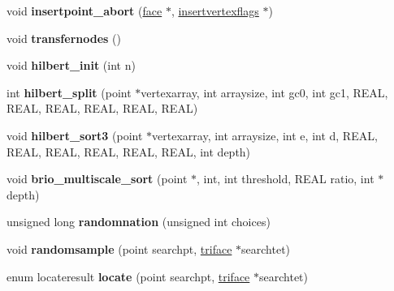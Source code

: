 \begin{DoxyCompactItemize}
\item 
\hypertarget{classtetgenmesh_ac7173aaaeb5600daa685af9c2c718834}{void {\bfseries insertpoint\-\_\-abort} (\hyperlink{classtetgenmesh_1_1face}{face} $\ast$, \hyperlink{classtetgenmesh_1_1insertvertexflags}{insertvertexflags} $\ast$)}\label{classtetgenmesh_ac7173aaaeb5600daa685af9c2c718834}

\item 
\hypertarget{classtetgenmesh_aca4cdd18ce8662d83d00f3be302e594d}{void {\bfseries transfernodes} ()}\label{classtetgenmesh_aca4cdd18ce8662d83d00f3be302e594d}

\item 
\hypertarget{classtetgenmesh_a5b84bd9ae3b1797a1e11730b23c1a2c0}{void {\bfseries hilbert\-\_\-init} (int n)}\label{classtetgenmesh_a5b84bd9ae3b1797a1e11730b23c1a2c0}

\item 
\hypertarget{classtetgenmesh_a11227c742897ec6e617a82dc61fc460d}{int {\bfseries hilbert\-\_\-split} (point $\ast$vertexarray, int arraysize, int gc0, int gc1, R\-E\-A\-L, R\-E\-A\-L, R\-E\-A\-L, R\-E\-A\-L, R\-E\-A\-L, R\-E\-A\-L)}\label{classtetgenmesh_a11227c742897ec6e617a82dc61fc460d}

\item 
\hypertarget{classtetgenmesh_a49edbd210b6c45754eca98046b0ef477}{void {\bfseries hilbert\-\_\-sort3} (point $\ast$vertexarray, int arraysize, int e, int d, R\-E\-A\-L, R\-E\-A\-L, R\-E\-A\-L, R\-E\-A\-L, R\-E\-A\-L, R\-E\-A\-L, int depth)}\label{classtetgenmesh_a49edbd210b6c45754eca98046b0ef477}

\item 
\hypertarget{classtetgenmesh_a3f09dd9fb2d975c75397a92aa6128565}{void {\bfseries brio\-\_\-multiscale\-\_\-sort} (point $\ast$, int, int threshold, R\-E\-A\-L ratio, int $\ast$depth)}\label{classtetgenmesh_a3f09dd9fb2d975c75397a92aa6128565}

\item 
\hypertarget{classtetgenmesh_a0ae35b219eb4a0d1e0c14f9759cd6563}{unsigned long {\bfseries randomnation} (unsigned int choices)}\label{classtetgenmesh_a0ae35b219eb4a0d1e0c14f9759cd6563}

\item 
\hypertarget{classtetgenmesh_aa05e91020e6e60c4bc589571c64ae646}{void {\bfseries randomsample} (point searchpt, \hyperlink{classtetgenmesh_1_1triface}{triface} $\ast$searchtet)}\label{classtetgenmesh_aa05e91020e6e60c4bc589571c64ae646}

\item 
\hypertarget{classtetgenmesh_a909ae9072f70495a9dbb1ee6f0e9f151}{enum locateresult {\bfseries locate} (point searchpt, \hyperlink{classtetgenmesh_1_1triface}{triface} $\ast$searchtet)}\label{classtetgenmesh_a909ae9072f70495a9dbb1ee6f0e9f151}


\end{DoxyCompactItemize}
